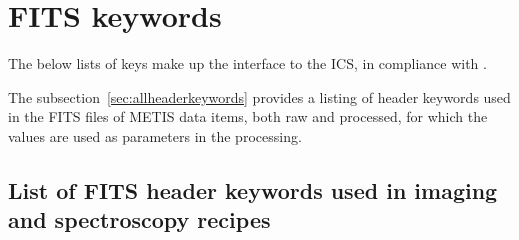 \section{FITS keywords}
\label{app:fits_keywords}

The below lists of keys make up the interface to the \ac{ICS}, in compliance with .



The subsection~\ref{sec:allheaderkeywords} provides a listing of header keywords used in the FITS files of METIS data items, both raw and processed, for which the values are used as parameters in the processing.

\subsection{List of FITS header keywords used in imaging and spectroscopy recipes}
\label{sec:essentialimagingheaders}


